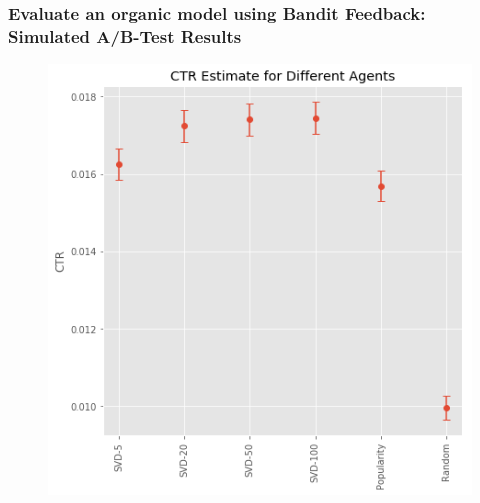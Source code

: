 \begin{frame}
  \frametitle{Evaluate an organic model using Bandit Feedback: Simulated A/B-Test Results}
\begin{figure}[h!]
\includegraphics[scale=0.4]{images/evalorganicwithbandit7.png}
\centering
\label{motex1}
\end{figure}
\end{frame}
